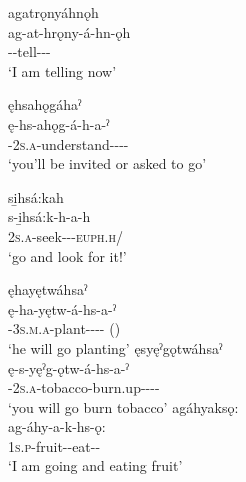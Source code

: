 
 \ex agatrǫnyáhnǫh\\
\gll ag-at-hrǫny-á-hn-ǫh\\
 -{\semireflexive}-tell-{\joinerA}-{\dislocative}-{\stative}\\
\glt `I am telling now'
\z
\z

\ea\label{ex:dislocendex4}  {\dislocative}
\ea ęhsahǫgáhaˀ\\
\gll ę-hs-ahǫg-á-h-a-ˀ\\
{\future}-\textsc{2s.a}-understand-{\joinerA}-{\dislocative}-{\joinerA}-{\punctual}\\
\glt ‘you’ll be invited or asked to go’


\ex si̱hsá:kah\\
\gll s-i̱hsá:k-h-a-h\\
 \textsc{2s.a}-seek-{\dislocative}-{\joinerA}-\textsc{euph.h}/{\noaspect}\\
\glt `go and look for it!'


\z
\z

\ea\label{ex:dislocendex5}  {\dislocative}
\ea ęhayętwáhsaˀ\\
\gll ę-ha-yętw-á-hs-a-ˀ\\
 \fut-\textsc{3s.m.a}-plant-{\joinerA}-{\dislocative}-{\joinerA}-{\punctual} (\cite{foster_course_1993}) \\
\glt `he will go planting'
\ex ęsyęˀgǫtwáhsaˀ\\
\gll ę-s-yęˀg-ǫtw-á-hs-a-ˀ\\
 \fut-\textsc{2s.a}-tobacco-burn.up-{\joinerA}-{\dislocative}-{\joinerA}-{\punctual}\\
\glt `you will go burn tobacco'
\ex agáhyaksǫ:\\
\gll ag-áhy-a-k-hs-ǫ:\\
 \textsc{1s.p}-fruit-{\joinerA}-eat-{\dislocative}-{\stative}\\
\glt `I am going and eating fruit'
\z
\z

